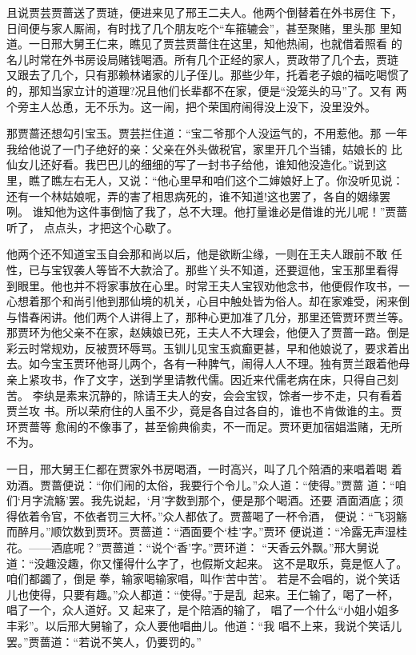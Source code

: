 且说贾芸贾蔷送了贾琏，便进来见了邢王二夫人。他两个倒替着在外书房住
下，日间便与家人厮闹，有时找了几个朋友吃个“车箍辘会”，甚至聚赌，里头那
里知道。一日邢大舅王仁来，瞧见了贾芸贾蔷住在这里，知他热闹，也就借着照看
的名儿时常在外书房设局赌钱喝酒。所有几个正经的家人，贾政带了几个去，贾琏
又跟去了几个，只有那赖林诸家的儿子侄儿。那些少年，托着老子娘的福吃喝惯了
的，那知当家立计的道理?况且他们长辈都不在家，便是“没笼头的马”了。又有
两个旁主人怂恿，无不乐为。这一闹，把个荣国府闹得没上没下，没里没外。

那贾蔷还想勾引宝玉。贾芸拦住道：“宝二爷那个人没运气的，不用惹他。那
一年我给他说了一门子绝好的亲：父亲在外头做税官，家里开几个当铺，姑娘长的
比仙女儿还好看。我巴巴儿的细细的写了一封书子给他，谁知他没造化。”说到这
里，瞧了瞧左右无人，又说：“他心里早和咱们这个二婶娘好上了。你没听见说：
还有一个林姑娘呢，弄的害了相思病死的，谁不知道!这也罢了，各自的姻缘罢咧。
谁知他为这件事倒恼了我了，总不大理。他打量谁必是借谁的光儿呢！”贾蔷听了，
点点头，才把这个心歇了。

他两个还不知道宝玉自会那和尚以后，他是欲断尘缘，一则在王夫人跟前不敢
任性，已与宝钗袭人等皆不大款洽了。那些丫头不知道，还要逗他，宝玉那里看得
到眼里。他也并不将家事放在心里。时常王夫人宝钗劝他念书，他便假作攻书，一
心想着那个和尚引他到那仙境的机关，心目中触处皆为俗人。却在家难受，闲来倒
与惜春闲讲。他们两个人讲得上了，那种心更加准了几分，那里还管贾环贾兰等。
那贾环为他父亲不在家，赵姨娘已死，王夫人不大理会，他便入了贾蔷一路。倒是
彩云时常规劝，反被贾环辱骂。玉钏儿见宝玉疯癫更甚，早和他娘说了，要求着出
去。如今宝玉贾环他哥儿两个，各有一种脾气，闹得人人不理。独有贾兰跟着他母
亲上紧攻书，作了文字，送到学里请教代儒。因近来代儒老病在床，只得自己刻苦。
李纨是素来沉静的，除请王夫人的安，会会宝钗，馀者一步不走，只有看着贾兰攻
书。所以荣府住的人虽不少，竟是各自过各自的，谁也不肯做谁的主。贾环贾蔷等
愈闹的不像事了，甚至偷典偷卖，不一而足。贾环更加宿娼滥赌，无所不为。

一日，邢大舅王仁都在贾家外书房喝酒，一时高兴，叫了几个陪酒的来唱着喝
着劝酒。贾蔷便说：“你们闹的太俗，我要行个令儿。”众人道：“使得。”贾蔷
道：“咱们‘月字流觞’罢。我先说起，‘月’字数到那个，便是那个喝酒。还要
酒面酒底；须得依着令官，不依者罚三大杯。”众人都依了。贾蔷喝了一杯令酒，
便说：“飞羽觞而醉月。”顺饮数到贾环。贾蔷道：“酒面要个‘桂’字。”贾环
便说道：“冷露无声湿桂花。——酒底呢？”贾蔷道：“说个‘香’字。”贾环道：
“天香云外飘。”邢大舅说道：“没趣没趣，你又懂得什么字了，也假斯文起来。
这不是取乐，竟是怄人了。咱们都蠲了，倒是拳，输家喝输家唱，叫作‘苦中苦’。
若是不会唱的，说个笑话儿也使得，只要有趣。”众人都道：“使得。”于是乱
起来。王仁输了，喝了一杯，唱了一个，众人道好。又起来了，是个陪酒的输了，
唱了一个什么“小姐小姐多丰彩”。以后邢大舅输了，众人要他唱曲儿。他道：“我
唱不上来，我说个笑话儿罢。”贾蔷道：“若说不笑人，仍要罚的。”

